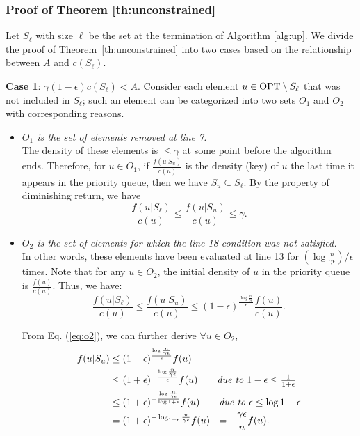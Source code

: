 \documentclass[10pt]{article} %
\theoremstyle{remark}
\newcommand{\OPT}{{\rm OPT}}
\begin{document}
\subsubsection{Proof of Theorem \ref{th:unconstrained} }

Let $S_\ell$ with size $\ell$ be the set at the termination of Algorithm \ref{alg:up}. We divide the proof of Theorem~\ref{th:unconstrained} into two cases based on the relationship between $A$ and $c(S_\ell)$. 


\textbf{Case 1}: $\gamma (1-\epsilon)c(S_\ell) < A$.
    Consider each element $u \in \OPT \setminus S_\ell$ that was not included in $S_\ell$; such an element can be categorized into two sets $O_1$ and $O_2$ with corresponding reasons.
    
     \begin{itemize}
         \item \textit{$O_1$ is the set of elements removed at line 7.\ }\\
     The density of these elements is $\leq \gamma$ at some point before the algorithm ends. Therefore, for $u \in O_1$, if $\frac{f(u|S_u)}{c(u)}$ is the density (key) of $u$ the last time it appears in the priority queue, then we have $S_u \subseteq S_\ell$. By the property of diminishing return, we have
        \begin{equation}
        \label{eq:o1}
            \frac{f(u|S_\ell)}{c(u)} \leq \frac{f(u|S_u)}{c(u)} \leq \gamma.
        \end{equation}
        \item \textit{$O_2$ is the set of elements for which the line 18 condition was not satisfied.\ }\\
    In other words, these elements have been evaluated at line 13 for $(\log \frac{n}{\gamma\epsilon})/{\epsilon}$ times. Note that for any $u \in O_2$, the initial density of $u$ in the priority queue is $\frac{f(u)}{c(u)}$. Thus, we have: 
        \begin{equation}
            \label{eq:o2}
            \frac{f(u|S_\ell)}{c(u)} \leq \frac{f(u|S_u)}{c(u)} \leq (1-\epsilon)^{\frac{\log \frac{n}{\gamma \epsilon}}{\epsilon}}  \frac{f(u)}{c(u)}.
        \end{equation}
     
    From Eq. (\ref{eq:o2}), we can further derive $\forall u \in O_2$,
    \begin{align}
    \label{eq:derive-o2}
        f(u|S_u) &\leq (1-\epsilon)^{\frac{\log \frac{n}{\gamma \epsilon}}{\epsilon}} f(u) \nonumber\\
        &\leq (1+\epsilon)^{-\frac{\log \frac{n}{\gamma \epsilon}}{\epsilon}}f(u) \quad \quad \mbox{\it due to $1-\epsilon \leq \frac{1}{1+\epsilon}$} \nonumber\\
        &\leq (1+\epsilon)^{-\frac{\log \frac{n}{\gamma \epsilon}}{\log 1+\epsilon}}f(u) \quad \quad \mbox{\it due to $\epsilon \leq \log{1+\epsilon}$}\nonumber\\
        &= (1+\epsilon)^{-\log_{1+\epsilon} \frac{n}{\gamma \epsilon}}f(u) ~~=~~\frac{\gamma \epsilon}{n} f(u).
    \end{align}
    \end{itemize}
    
\end{document}
